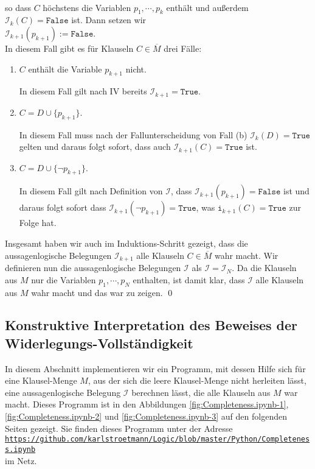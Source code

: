 \begin{enumerate}
\begin{enumerate}
    \\[0.2cm]
    so dass $C$ höchstens die Variablen $p_1,\cdots,p_k$ enthält und außerdem $\mathcal{I}_k(C) = \mathtt{False}$
    ist.  Dann setzen wir
    \\[0.2cm]
    \hspace*{1.3cm}
    $\mathcal{I}_{k+1}(p_{k+1}) := \mathtt{False}$.
    \\[0.2cm]    
    In diesem Fall gibt es für Klauseln $C \in \overline{M}$ drei Fälle:
    \begin{enumerate}[1.]
    \item $C$ enthält die Variable $p_{k+1}$ nicht.
      
          In diesem Fall gilt nach IV bereits $\mathcal{I}_{k+1} = \mathtt{True}$.        
    \item $C = D \cup \{ p_{k+1} \}$.

          In diesem Fall muss nach der Fallunterscheidung von Fall (b) $\mathcal{I}_k(D) = \mathtt{True}$
          gelten und daraus folgt sofort, dass auch $\mathcal{I}_{k+1}(C) = \mathtt{True}$ ist.
    \item $C = D \cup \{ \neg p_{k+1} \}$.

          In diesem Fall gilt nach Definition von $\mathcal{I}$, dass $\mathcal{I}_{k+1}(p_{k+1}) = \mathtt{False}$
          ist und daraus folgt sofort dass $\mathcal{I}_{k+1}(\neg p_{k+1}) = \mathtt{True}$, was
          $\mathtt{i}_{k+1}(C) = \mathtt{True}$ zur Folge hat.
    \end{enumerate}
    Insgesamt haben wir auch im Induktions-Schritt gezeigt, dass die aussagenlogische Belegungen
    $\mathcal{I}_{k+1}$ alle Klauseln $C \in \overline{M}$ wahr macht.  Wir definieren nun die aussagenlogische
    Belegungen $\mathcal{I}$ als $\mathcal{I} = \mathcal{I}_N$.  Da die Klauseln aus $M$ nur die Variablen
    $p_1, \cdots, p_N$ enthalten, ist damit klar, dass $\mathcal{I}$ alle Klauseln aus $M$ wahr macht und das
    war zu zeigen. \qed
  \end{enumerate}
\end{enumerate}

\subsection{Konstruktive Interpretation des Beweises der Widerlegungs-Vollständigkeit}
In diesem Abschnitt implementieren wir ein Programm, mit dessen Hilfe sich für eine Klausel-Menge $M$, aus der
sich die leere Klausel-Menge nicht herleiten lässt, eine aussagenlogische Belegung $\mathcal{I}$ berechnen
lässt, die alle Klauseln aus $M$ war macht.  Dieses Programm ist in den 
Abbildungen \ref{fig:Completeness.ipynb-1}, \ref{fig:Completeness.ipynb-2} und
\ref{fig:Completeness.ipynb-3} auf den folgenden Seiten gezeigt.  Sie finden dieses Programm unter der Adresse
\\[0.2cm]
\hspace*{0.8cm}
\href{https://github.com/karlstroetmann/Logic/blob/master/Python/Completeness.ipynb}{\texttt{https://github.com/karlstroetmann/Logic/blob/master/Python/Completeness.ipynb}}
\\[0.2cm]
im Netz.

